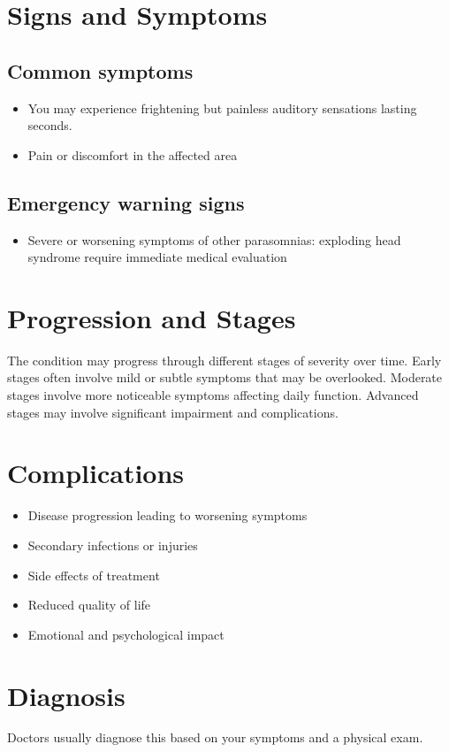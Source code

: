 \section{Signs and Symptoms}

\subsection{Common symptoms}
\begin{itemize}[noitemsep]
  \item You may experience frightening but painless auditory sensations lasting seconds.
  \item Pain or discomfort in the affected area
  \end{itemize}

\subsection{Emergency warning signs}
\begin{itemize}[noitemsep]
  \item Severe or worsening symptoms of other parasomnias: exploding head syndrome require immediate medical evaluation
\end{itemize}
\section{Progression and Stages}
The condition may progress through different stages of severity over time. Early stages often involve mild or subtle symptoms that may be overlooked. Moderate stages involve more noticeable symptoms affecting daily function. Advanced stages may involve significant impairment and complications.
\section{Complications}
\begin{itemize}[noitemsep]
  \item Disease progression leading to worsening symptoms
  \item Secondary infections or injuries
  \item Side effects of treatment
  \item Reduced quality of life
  \item Emotional and psychological impact
\end{itemize}
\section{Diagnosis}
Doctors usually diagnose this based on your symptoms and a physical exam.


